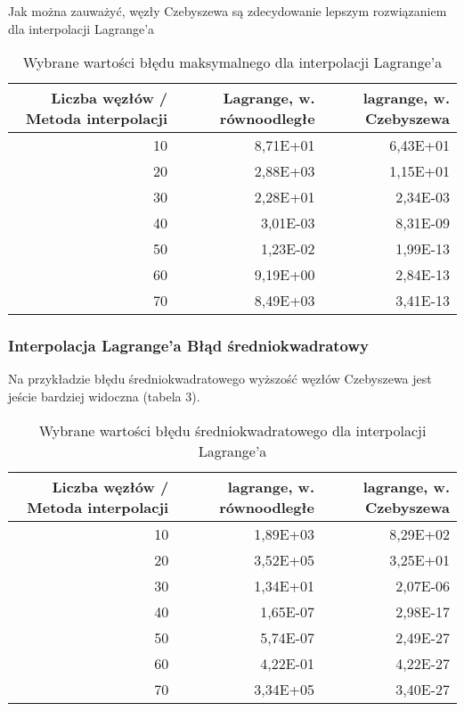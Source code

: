 \documentclass{article}
\begin{document}
Jak można zauważyć, węzły Czebyszewa są zdecydowanie lepszym rozwiązaniem dla interpolacji Lagrange'a

\begin{table}[H]
    \centering
    \begin{tabular}{|r|r|r|}
    \hline
        Liczba węzłów / Metoda interpolacji & Lagrange, w. równoodległe & lagrange, w. Czebyszewa  \\ \hline
        10 & 8,71E+01 & 6,43E+01  \\ \hline
        20 & 2,88E+03 & 1,15E+01  \\ \hline
        30 & 2,28E+01 & 2,34E-03  \\ \hline
        40 & 3,01E-03 & 8,31E-09  \\ \hline
        50 & 1,23E-02 & 1,99E-13  \\ \hline
        60 & 9,19E+00 & 2,84E-13  \\ \hline
        70 & 8,49E+03 & 3,41E-13 \\ \hline
    \end{tabular}
    \caption{Wybrane wartości błędu maksymalnego dla interpolacji Lagrange'a}
\end{table}

\subsubsection{Interpolacja Lagrange'a Błąd średniokwadratowy}

Na przykładzie błędu średniokwadratowego wyższość węzłów Czebyszewa jest jeście bardziej widoczna (tabela 3).

\begin{table}[H]
    \centering
    \begin{tabular}{|r|r|r|}
    \hline
        Liczba węzłów / Metoda interpolacji & lagrange, w. równoodległe & lagrange, w. Czebyszewa  \\ \hline
        10 & 1,89E+03 & 8,29E+02  \\ \hline
        20 & 3,52E+05 & 3,25E+01  \\ \hline
        30 & 1,34E+01 & 2,07E-06  \\ \hline
        40 & 1,65E-07 & 2,98E-17  \\ \hline
        50 & 5,74E-07 & 2,49E-27  \\ \hline
        60 & 4,22E-01 & 4,22E-27  \\ \hline
        70 & 3,34E+05 & 3,40E-27 \\ \hline
    \end{tabular}
    \caption{Wybrane wartości błędu średniokwadratowego dla interpolacji Lagrange'a}
\end{table}
\end{document}
